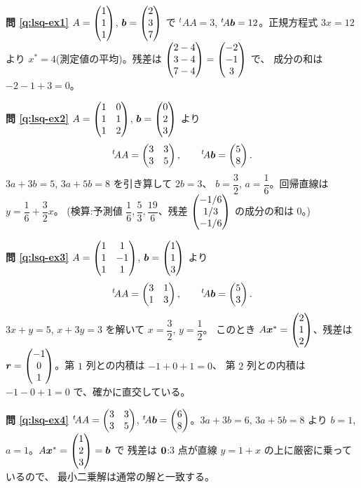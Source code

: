 \bigskip
\noindent\textbf{問 \ref{q:lsq-ex1}}\quad
$A = \begin{pmatrix}1 \\ 1 \\ 1\end{pmatrix}$, $\bm{b} = \begin{pmatrix}2 \\ 3 \\ 7\end{pmatrix}$ で
${}^t\!AA = 3$, ${}^t\!A\bm{b} = 12$。正規方程式 $3x = 12$ より
$x^* = 4$(測定値の平均)。残差は
$\begin{pmatrix}2 - 4 \\ 3 - 4 \\ 7 - 4\end{pmatrix} = \begin{pmatrix}-2 \\ -1 \\ 3\end{pmatrix}$ で、
成分の和は $-2 - 1 + 3 = 0$。

\bigskip
\noindent\textbf{問 \ref{q:lsq-ex2}}\quad
$A = \begin{pmatrix}1 & 0 \\ 1 & 1 \\ 1 & 2\end{pmatrix}$, $\bm{b} = \begin{pmatrix}0 \\ 2 \\ 3\end{pmatrix}$ より
\[
{}^t\!AA = \begin{pmatrix}3 & 3 \\ 3 & 5\end{pmatrix}, \qquad {}^t\!A\bm{b} = \begin{pmatrix}5 \\ 8\end{pmatrix}.
\]
$3a + 3b = 5$, $3a + 5b = 8$ を引き算して $2b = 3$、
$b = \dfrac{3}{2}$, $a = \dfrac{1}{6}$。回帰直線は
$y = \dfrac{1}{6} + \dfrac{3}{2}x$。
(検算:予測値 $\dfrac{1}{6}, \dfrac{5}{3}, \dfrac{19}{6}$、残差
$\begin{pmatrix}-1/6 \\ 1/3 \\ -1/6\end{pmatrix}$ の成分の和は $0$。)

\bigskip
\noindent\textbf{問 \ref{q:lsq-ex3}}\quad
$A = \begin{pmatrix}1 & 1 \\ 1 & -1 \\ 1 & 1\end{pmatrix}$, $\bm{b} = \begin{pmatrix}1 \\ 1 \\ 3\end{pmatrix}$ より
\[
{}^t\!AA = \begin{pmatrix}3 & 1 \\ 1 & 3\end{pmatrix}, \qquad {}^t\!A\bm{b} = \begin{pmatrix}5 \\ 3\end{pmatrix}.
\]
$3x + y = 5$, $x + 3y = 3$ を解いて $x = \dfrac{3}{2}$, $y = \dfrac{1}{2}$。
このとき $A\bm{x}^* = \begin{pmatrix}2 \\ 1 \\ 2\end{pmatrix}$、残差は
$\bm{r} = \begin{pmatrix}-1 \\ 0 \\ 1\end{pmatrix}$。第 $1$ 列との内積は $-1 + 0 + 1 = 0$、
第 $2$ 列との内積は $-1 - 0 + 1 = 0$ で、確かに直交している。

\bigskip
\noindent\textbf{問 \ref{q:lsq-ex4}}\quad
${}^t\!AA = \begin{pmatrix}3 & 3 \\ 3 & 5\end{pmatrix}$,
${}^t\!A\bm{b} = \begin{pmatrix}6 \\ 8\end{pmatrix}$。$3a + 3b = 6$, $3a + 5b = 8$ より
$b = 1$, $a = 1$。$A\bm{x}^* = \begin{pmatrix}1 \\ 2 \\ 3\end{pmatrix} = \bm{b}$ で
残差は $\bm{0}$:$3$ 点が直線 $y = 1 + x$ の上に厳密に乗っているので、
最小二乗解は通常の解と一致する。

